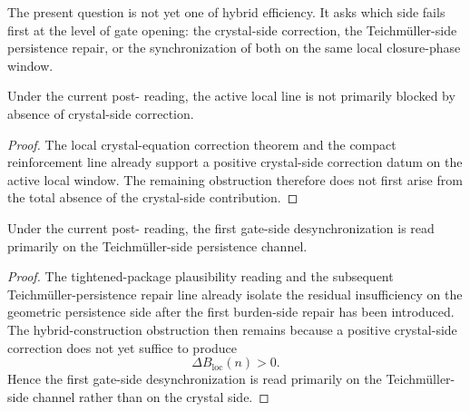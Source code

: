 \begin{remark}
\label{rem:what-first-out-of-sync-means}
The present question is not yet one of hybrid efficiency.
It asks which side fails first at the level of gate opening:
the crystal-side correction, the Teichm\"uller-side persistence repair, or the synchronization of both on the same local closure-phase window.
\end{remark}

\begin{proposition}
\label{prop:current-line-is-not-crystal-obstruction-prior}
Under the current post- reading, the active local line is not primarily blocked by absence of crystal-side correction.
\end{proposition}

\begin{proof}
The local crystal-equation correction theorem and the compact reinforcement line already support a positive crystal-side correction datum on the active local window.
The remaining obstruction therefore does not first arise from the total absence of the crystal-side contribution.
\end{proof}

\begin{proposition}
\label{prop:current-line-is-teichmueller-side-prior-at-the-gate}
Under the current post- reading, the first gate-side desynchronization is read primarily on the Teichm\"uller-side persistence channel.
\end{proposition}

\begin{proof}
The tightened-package plausibility reading and the subsequent Teichm\"uller-persistence repair line already isolate the residual insufficiency on the geometric persistence side after the first burden-side repair has been introduced.
The hybrid-construction obstruction then remains because a positive crystal-side correction does not yet suffice to produce
\[
 \Delta B_{\mathrm{loc}}(n)>0.
\]
Hence the first gate-side desynchronization is read primarily on the Teichm\"uller-side channel rather than on the crystal side.
\end{proof}

